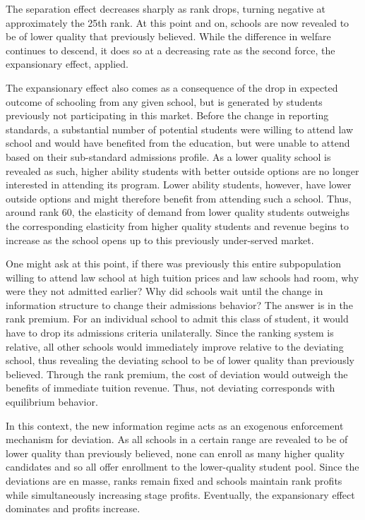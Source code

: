 \documentclass[12pt]{article}
\theoremstyle{definition}
\begin{document}
The separation effect decreases sharply as rank drops, turning negative at approximately the 25th rank. At this point and on, schools are now revealed to be of lower quality that previously believed. While the difference in welfare continues to descend, it does so at a decreasing rate as the second force, the expansionary effect, applied.

The expansionary effect also comes as a consequence of the drop in expected outcome of schooling from any given school, but is generated by students previously not participating in this market. Before the change in reporting standards, a substantial number of potential students were willing to attend law school and would have benefited from the education, but were unable to attend based on their sub-standard admissions profile. As a lower quality school is revealed as such, higher ability students with better outside options are no longer interested in attending its program. Lower ability students, however, have lower outside options and might therefore benefit from attending such a school. Thus, around rank 60, the elasticity of demand from lower quality students outweighs the corresponding elasticity from higher quality students and revenue begins to increase as the school opens up to this previously under-served market.

One might ask at this point, if there was previously this entire subpopulation willing to attend law school at high tuition prices and law schools had room, why were they not admitted earlier? Why did schools wait until the change in information structure to change their admissions behavior? The answer is in the rank premium. For an individual school to admit this class of student, it would have to drop its admissions criteria unilaterally. Since the ranking system is relative, all other schools would immediately improve relative to the deviating school, thus revealing the deviating school to be of lower quality than previously believed. Through the rank premium, the cost of deviation would outweigh the benefits of immediate tuition revenue. Thus, not deviating corresponds with equilibrium behavior.

In this context, the new information regime acts as an exogenous enforcement mechanism for deviation. As all schools in a certain range are revealed to be of lower quality than previously believed, none can enroll as many higher quality candidates and so all offer enrollment to the lower-quality student pool. Since the deviations are en masse, ranks remain fixed and schools maintain rank profits while simultaneously increasing stage profits.
Eventually, the expansionary effect dominates and profits increase. %
\end{document}
